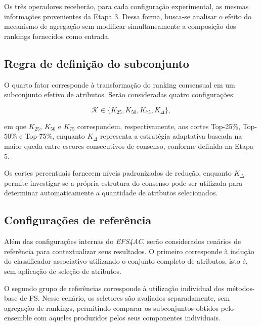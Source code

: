 Os três operadores receberão, para cada configuração experimental, as mesmas
informações provenientes da Etapa 3. Dessa forma, busca-se analisar o efeito
do mecanismo de agregação sem modificar simultaneamente a composição dos
rankings fornecidos como entrada.


\subsection{Regra de definição do subconjunto}
\label{subsec:ac-efs-config-corte}

O quarto fator corresponde à transformação do ranking consensual em um
subconjunto efetivo de atributos. Serão consideradas quatro configurações:

\begin{equation}
    \mathcal{K}
    \in
    \{
        K_{25},
        K_{50},
        K_{75},
        K_{\Delta}
    \},
\end{equation}

em que $K_{25}$, $K_{50}$ e $K_{75}$ correspondem, respectivamente, aos
cortes Top-25\%, Top-50\% e Top-75\%, enquanto $K_{\Delta}$ representa a
estratégia adaptativa baseada na maior queda entre escores consecutivos de
consenso, conforme definida na Etapa 5.

Os cortes percentuais fornecem níveis padronizados de redução, enquanto
$K_{\Delta}$ permite investigar se a própria estrutura do consenso pode ser
utilizada para determinar automaticamente a quantidade de atributos
selecionados.


\subsection{Configurações de referência}
\label{subsec:ac-efs-config-referencia}

Além das configurações internas do \textit{EFS4AC}, serão considerados
cenários de referência para contextualizar seus resultados. O primeiro
corresponde à indução do classificador associativo utilizando o conjunto
completo de atributos, isto é, sem aplicação de seleção de atributos.

O segundo grupo de referências corresponde à utilização individual dos
métodos-base de FS. Nesse cenário, os seletores são avaliados separadamente,
sem agregação de rankings, permitindo comparar os subconjuntos obtidos pelo
ensemble com aqueles produzidos pelos seus componentes individuais.

